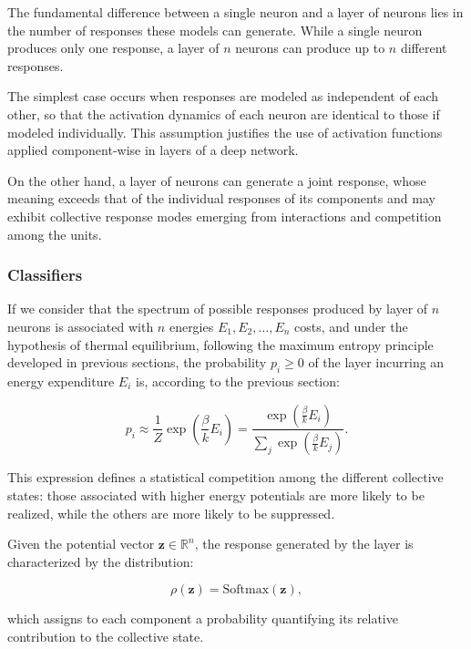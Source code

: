 \documentclass[12pt]{article}
\begin{document}
The fundamental difference between a single neuron and a layer of neurons lies in the number of responses these models can generate. While a single neuron produces only one response, a layer of $n$ neurons can produce up to $n$ different responses.

The simplest case occurs when responses are modeled as independent of each other, so that the activation dynamics of each neuron are identical to those if modeled individually. This assumption justifies the use of activation functions applied component-wise in layers of a deep network.

On the other hand, a layer of neurons can generate a joint response, whose meaning exceeds that of the individual responses of its components and may exhibit collective response modes emerging from interactions and competition among the units.
\subsubsection*{Classifiers}

If we consider that the spectrum of possible responses produced by layer of $n$ neurons is associated with $n$ energies $E_1, E_2, \ldots, E_n$ costs, and under the hypothesis of thermal equilibrium, following the maximum entropy principle developed in previous sections, the probability $p_i \ge 0$ of the layer incurring an energy expenditure $E_i$ is, according to the previous section:

\begin{equation}
p_i \approx \frac{1}{Z} \exp\left(\frac{\beta}{k} E_i\right)  
= \frac{\exp\left(\frac{\beta}{k} E_i\right)}{\sum_j \exp\left(\frac{\beta}{k} E_j\right)}.
\end{equation}

This expression defines a statistical competition among the different collective states: those associated with higher energy potentials are more likely to be realized, while the others are more likely to be suppressed.

Given the potential vector $\mathbf{z} \in \mathbb{R}^n$, the response generated by the layer is characterized by the distribution:

\begin{equation}
\rho(\mathbf{z}) = \text{Softmax}(\mathbf{z}),
\end{equation}

which assigns to each component a probability quantifying its relative contribution to the collective state.
\end{document}
